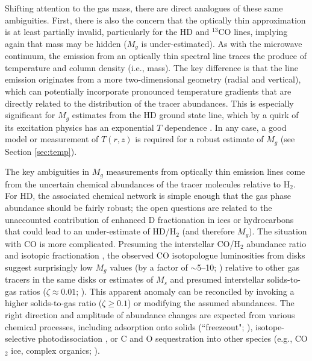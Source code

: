 \documentclass[a4paper]{ar-1col}
\begin{document}
Shifting attention to the gas mass, there are direct analogues of these same ambiguities.  First, there is also the concern that the optically thin approximation is at least partially invalid, particularly for the HD and $^{13}$CO lines, implying again that mass may be hidden ($M_g$ is under-estimated).  As with the microwave continuum, the emission from an optically thin spectral line traces the produce of temperature and column density (i.e., mass).  The key difference is that the line emission originates from a more two-dimensional geometry (radial and vertical), which can potentially incorporate pronounced temperature gradients that are directly related to the distribution of the tracer abundances.  This is especially significant for $M_g$ estimates from the HD ground state line, which by a quirk of its excitation physics has an exponential $T$ dependence \citep{bergin13}.  In any case, a good model or measurement of $T(r, z)$ is required for a robust estimate of $M_g$ (see Section \ref{sec:temp}).    

The key ambiguities in $M_g$ measurements from optically thin emission lines come from the uncertain chemical abundances of the tracer molecules relative to H$_2$.  For HD, the associated chemical network is simple enough that the gas phase abundance should be fairly robust; the open questions are related to the unaccounted contribution of enhanced D fractionation in ices or hydrocarbons that could lead to an under-estimate of HD/H$_2$ (and therefore $M_g$).  The situation with CO is more complicated.  Presuming the interstellar CO/H$_2$ abundance ratio and isotopic fractionation \citep{frerking82}, the observed CO isotopologue luminosities from disks suggest surprisingly low $M_g$ values (by a factor of $\sim$5--10; \citealt{williamsbest14}) relative to other gas tracers in the same disks \citep{chapillon10,favre13,kama16a} or estimates of $M_s$ and presumed interstellar solids-to-gas ratios ($\zeta \approx 0.01$; \citealt{kastner97,dutrey03,ansdell16,long17}).  This apparent anomaly can be reconciled by invoking a higher solids-to-gas ratio ($\zeta \ge 0.1$) or modifying the assumed abundances.  The right direction and amplitude of abundance changes are expected from various chemical processes, including adsorption onto solids (``freezeout"; \citealt{aikawa97,aikawa02,dutrey97}), isotope-selective photodissociation \citep{visser09,miotello14,miotello16}, or C and O sequestration into other species (e.g., CO$_2$ ice, complex organics; \citealt{reboussin15,yu17a,miotello17,bosman18,dodson-robinson18}).             
\end{document}
